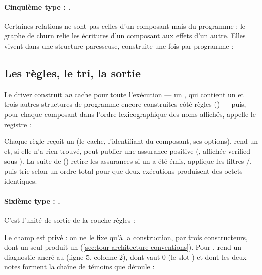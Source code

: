 \paragraph{Cinquième type : .} Certaines relations ne sont pas celles d'un composant mais du programme : le graphe de churn relie les écritures d'un composant aux effets d'un autre. Elles vivent dans une structure paresseuse, construite une fois par programme :


\subsection{Les règles, le tri, la sortie}

Le driver construit \emph{un} cache pour toute l'exécution --- un , qui contient un  et trois autres structures de programme encore construites côté règles () --- puis, pour chaque composant dans l'ordre lexicographique des noms affichés, appelle le registre :



Chaque règle reçoit un  (le cache, l'identifiant du composant, ses options), rend un  et, si elle n'a rien trouvé, peut publier une assurance positive (, affichée \og verified\fg{} sous ). La suite de  () retire les assurances si un  a été émis, applique les filtres /, puis trie selon un ordre total pour que deux exécutions produisent des octets identiques.

\paragraph{Sixième type : .} C'est l'unité de sortie de la couche règles :


Le champ  est privé : on ne le fixe qu'à la construction, par trois constructeurs, dont un seul produit un \Error{} (\cref{sec:tour-architecture-conventions}). Pour ,  rend un diagnostic \Warning{} ancré au  (ligne 5, colonne 2), dont  vaut 0 (le slot ) et dont les deux notes forment la chaîne de témoins que  déroule :

